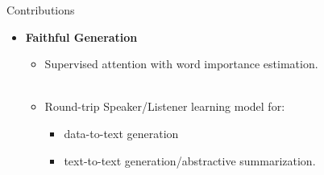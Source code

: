 \begin{frame}{Contributions}
 \begin{itemize}
  \item \textbf{Faithful Generation}
  \begin{itemize}
      \item Supervised attention with word importance estimation.\\~\\
      \item Round-trip Speaker/Listener learning model for:
          \begin{itemize}
              \item data-to-text generation 
              \item text-to-text generation/abstractive summarization.
          \end{itemize}
  \end{itemize}
 \end{itemize}
\end{frame}



